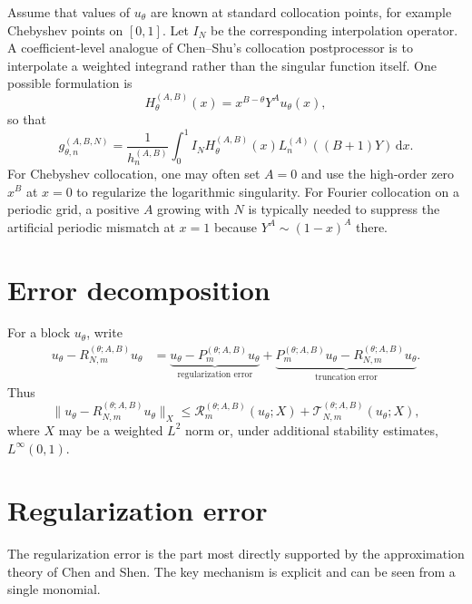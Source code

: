 \documentclass[11pt]{article}
\newcommand{\dd}{\,\mathrm{d}}
\newcommand{\cT}{\mathcal{T}}
\newcommand{\cR}{\mathcal{R}}
\newcommand{\Lag}{L}
\begin{document}
Assume that values of $u_\theta$ are known at standard collocation points, for example Chebyshev points on $[0,1]$.  Let $I_N$ be the corresponding interpolation operator.  A coefficient-level analogue of Chen--Shu's collocation postprocessor is to interpolate a weighted integrand rather than the singular function itself.  One possible formulation is
\begin{equation}\label{eq:colloc-weighted-function}
    H_\theta^{(A,B)}(x)=x^{B-\theta}Y^A u_\theta(x),
\end{equation}
so that
\begin{equation}\label{eq:colloc-gcoef}
    g_{\theta,n}^{(A,B,N)}
    =\frac{1}{h_n^{(A,B)}}
    \int_0^1
    I_NH_\theta^{(A,B)}(x)
    \Lag_n^{(A)}((B+1)Y)\dd x.
\end{equation}
For Chebyshev collocation, one may often set $A=0$ and use the high-order zero $x^B$ at $x=0$ to regularize the logarithmic singularity.  For Fourier collocation on a periodic grid, a positive $A$ growing with $N$ is typically needed to suppress the artificial periodic mismatch at $x=1$ because $Y^A\sim(1-x)^A$ there.

\section{Error decomposition}

For a block $u_\theta$, write
\begin{align}\label{eq:error-split}
    u_\theta-R_{N,m}^{(\theta;A,B)}u_\theta
    &=
    \underbrace{u_\theta-P_m^{(\theta;A,B)}u_\theta}_{\text{regularization error}}
    +
    \underbrace{P_m^{(\theta;A,B)}u_\theta-R_{N,m}^{(\theta;A,B)}u_\theta}_{\text{truncation error}}.
\end{align}
Thus
\begin{equation}\label{eq:error-split-norm}
    \|u_\theta-R_{N,m}^{(\theta;A,B)}u_\theta\|_X
    \le
    \cR_m^{(\theta;A,B)}(u_\theta;X)
    +\cT_{N,m}^{(\theta;A,B)}(u_\theta;X),
\end{equation}
where $X$ may be a weighted $L^2$ norm or, under additional stability estimates, $L^\infty(0,1)$.

\section{Regularization error}

The regularization error is the part most directly supported by the approximation theory of Chen and Shen.  The key mechanism is explicit and can be seen from a single monomial.
\end{document}
